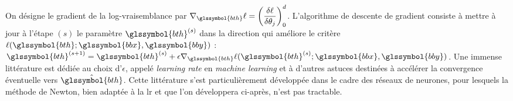 On désigne le gradient de la log-vraisemblance par $\nabla_{\glssymbol{bth}} \ell = \left( \dfrac{\delta \ell}{\delta \theta_j} \right)_0^d$. L'algorithme de descente de gradient consiste à mettre à jour à l'étape $(s)$ le paramètre $\glssymbol{bth}^{(s)}$ dans la direction qui améliore le critère $\ell(\glssymbol{bth};\glssymbol{bbx},\glssymbol{bby})$ : $\glssymbol{bth}^{(s+1)} = \glssymbol{bth}^{(s)} + \epsilon \nabla_{\glssymbol{bth}} \ell(\glssymbol{bth}^{(s)};\glssymbol{bbx},\glssymbol{bby})$. Une immense littérature est dédiée au choix d'$\epsilon$, appelé \textit{learning rate} en \textit{machine learning} et à d'autres astuces destinées à accélérer la convergence éventuelle vers $\hat{\glssymbol{bth}}$. Cette littérature s'est particulièrement développée dans le cadre des réseaux de neurones, pour lesquels la méthode de Newton, bien adaptée à la \gls{lr} et que l'on développera ci-après, n'est pas tractable.

